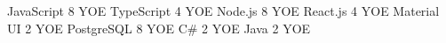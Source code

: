 \begin{cvhonors}
  \cvhonor
    {JavaScript}
    {8 YOE}
    {\faStar \faStar \faStar \faStar \faStar}
    {}
  \cvhonor
    {TypeScript }
    {4 YOE}
    {\faStar \faStar \faStarHalfEmpty \faStarO \faStarO}
    {}
  \cvhonor
    {Node.js}
    {8 YOE}
    {\faStar \faStar \faStar \faStar \faStar}
    {} 
  \cvhonor
    {React.js }
    {4 YOE}
    {\faStar \faStar \faStarHalfEmpty \faStarO \faStarO}
    {} 
  \cvhonor
    {Material UI }
    {2 YOE}
    {\faStar \faStarHalfEmpty \faStarO \faStarO \faStarO}
    {}
  \cvhonor
    {PostgreSQL}
    {8 YOE}
    {\faStar \faStar \faStar \faStar \faStar }
    {}  
  \cvhonor
    {C\#}
    {2 YOE}
    {\faStar \faStarHalfEmpty \faStarO \faStarO \faStarO}
    {}  
  \cvhonor
    {Java}
    {2 YOE}
    {\faStar \faStarHalfEmpty \faStarO \faStarO \faStarO}
    {}      
\end{cvhonors}
